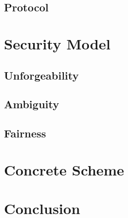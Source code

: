 \documentclass{beamer}
\begin{document}
\subsection{Protocol}


\section{Security Model}


\subsection{Unforgeability}


\subsection{Ambiguity}


\subsection{Fairness}


\section{Concrete Scheme}


\section{Conclusion}

\end{document}
